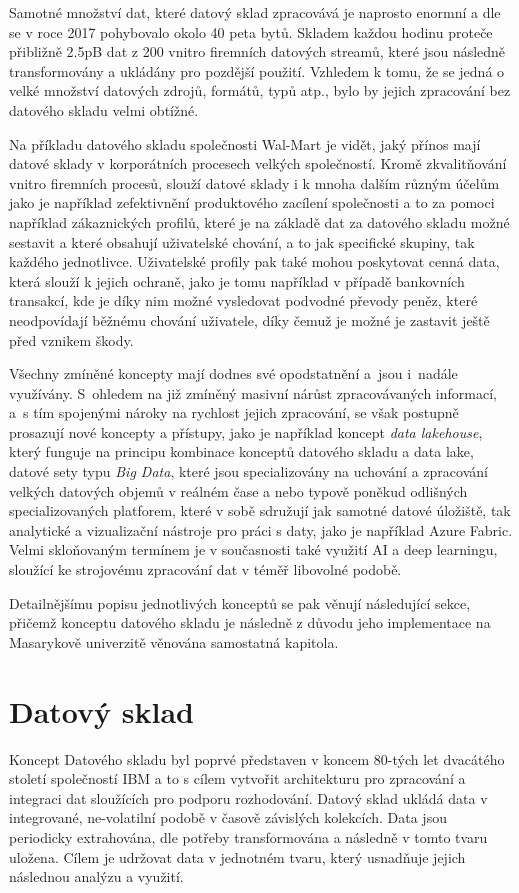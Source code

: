 \documentclass[
  digital,     %
  twoside,     %
  lof,         %
  lot,         %
]{fithesis4}
\begin{document}
Samotné množství dat, které datový sklad zpracovává je naprosto enormní a dle \citeauthor{Marr2017} se v roce 2017 pohybovalo okolo 40 peta bytů. Skladem každou hodinu proteče přibližně 2.5pB dat z 200 vnitro firemních datových streamů, které jsou následně transformovány a ukládány pro pozdější použití.\parencite{Marr2017} Vzhledem k tomu, že se jedná o velké množství datových zdrojů, formátů, typů atp., bylo by jejich zpracování bez datového skladu velmi obtížné.

Na příkladu datového skladu společnosti Wal-Mart je vidět, jaký přínos mají datové sklady v korporátních procesech velkých společností. Kromě zkvalitňování vnitro firemních procesů, slouží datové sklady i k mnoha dalším různým účelům jako je například zefektivnění produktového zacílení společnosti a to za pomoci například zákaznických profilů, které je na základě dat za datového skladu možné sestavit a které obsahují uživatelské chování, a to jak specifické skupiny, tak každého jednotlivce. Uživatelské profily pak také mohou poskytovat cenná data, která slouží k jejich ochraně, jako je tomu například v případě bankovních transakcí, kde je díky nim možné vysledovat podvodné převody peněz, které neodpovídají běžnému chování uživatele, díky čemuž je možné je zastavit ještě před vznikem škody.\parencite{Inmon2008}

Všechny zmíněné koncepty mají dodnes své opodstatnění a jsou i nadále využívány. S ohledem na již zmíněný masivní nárůst zpracovávaných informací, a s tím spojenými nároky na rychlost jejich zpracování, se však postupně prosazují nové koncepty a přístupy, jako je například koncept \emph{data lakehouse}, který funguje na principu kombinace konceptů datového skladu a data lake, datové sety typu \emph{Big Data}, které jsou specializovány na uchování a zpracování velkých datových objemů v reálném čase a nebo typově poněkud odlišných specializovaných platforem, které v sobě sdružují jak samotné datové úložiště, tak analytické a vizualizační nástroje pro práci s daty, jako je například Azure Fabric. Velmi skloňovaným termínem je v současnosti také využití AI a deep learningu, sloužící ke strojovému zpracování dat v téměř libovolné podobě.  

Detailnějšímu popisu jednotlivých konceptů se pak věnují následující sekce, přičemž konceptu datového skladu je následně z důvodu jeho implementace na Masarykově univerzitě věnována samostatná kapitola.

\section{Datový sklad}
Koncept Datového skladu byl poprvé představen v koncem 80-tých let dvacátého století společností IBM a to s cílem vytvořit architekturu pro zpracování a integraci dat sloužících pro podporu rozhodování. Datový sklad ukládá data v integrované, ne-volatilní podobě v časově závislých kolekcích. Data jsou periodicky extrahována, dle potřeby transformována a následně v tomto tvaru uložena. Cílem je udržovat data v jednotném tvaru, který usnadňuje jejich následnou analýzu a využití.\parencite[s.~3]{Nambiar2022}
\end{document}

